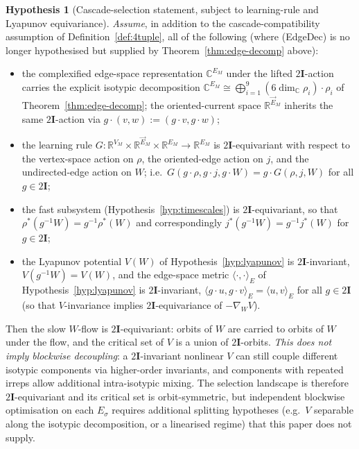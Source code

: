 \documentclass[11pt]{article}
\theoremstyle{definition}
\newtheorem{hypothesis}[theorem]{Hypothesis}
\newcommand{\R}{\mathbb{R}}
\newcommand{\C}{\mathbb{C}}
\newcommand{\twoI}{2\mathbf{I}}
\begin{document}
\begin{hypothesis}[Cascade-selection statement, subject to learning-rule and Lyapunov equivariance]\label{hyp:cascade-selection}
\emph{Assume}, in addition to the cascade-compatibility assumption of Definition~\ref{def:4tuple}, all of the following (where (EdgeDec) is no longer hypothesised but supplied by Theorem~\ref{thm:edge-decomp} above):
\begin{itemize}
    \item[\textup{(EdgeDec)} \emph{(supplied by Theorem~\ref{thm:edge-decomp})}] the complexified edge-space representation $\C^{E_M}$ under the lifted $\twoI$-action carries the explicit isotypic decomposition $\C^{E_M} \cong \bigoplus_{i=1}^9 (6\dim_\C\rho_i)\cdot\rho_i$ of Theorem~\ref{thm:edge-decomp}; the oriented-current space $\R^{\vec E_M}$ inherits the same $\twoI$-action via $g\cdot(v,w) := (g\cdot v, g\cdot w)$;
    \item[\textup{(LearnEq)}] the learning rule $G: \R^{V_M} \times \R^{\vec E_M} \times \R^{E_M} \to \R^{E_M}$ is $\twoI$-equivariant with respect to the vertex-space action on $\rho$, the oriented-edge action on $j$, and the undirected-edge action on $W$; i.e.\ $G(g \cdot \rho, g \cdot j, g \cdot W) = g \cdot G(\rho, j, W)$ for all $g \in \twoI$;
    \item[\textup{(FastEq)}] the fast subsystem (Hypothesis~\ref{hyp:timescales}) is $\twoI$-equivariant, so that $\rho^*(g^{-1} W) = g^{-1} \rho^*(W)$ and correspondingly $j^*(g^{-1} W) = g^{-1} j^*(W)$ for $g \in \twoI$;
    \item[\textup{(LyapInv)}] the Lyapunov potential $V(W)$ of Hypothesis~\ref{hyp:lyapunov} is $\twoI$-invariant, $V(g^{-1} W) = V(W)$, and the edge-space metric $\langle\cdot,\cdot\rangle_E$ of Hypothesis~\ref{hyp:lyapunov} is $\twoI$-invariant, $\langle g \cdot u, g \cdot v\rangle_E = \langle u, v \rangle_E$ for all $g \in \twoI$ (so that $V$-invariance implies $\twoI$-equivariance of $-\nabla_W V$).
\end{itemize}
Then the slow $W$-flow is $\twoI$-equivariant: orbits of $W$ are carried to orbits of $W$ under the flow, and the critical set of $V$ is a union of $\twoI$-orbits. \emph{This does not imply blockwise decoupling}: a $\twoI$-invariant nonlinear $V$ can still couple different isotypic components via higher-order invariants, and components with repeated irreps allow additional intra-isotypic mixing. The selection landscape is therefore $\twoI$-equivariant and its critical set is orbit-symmetric, but independent blockwise optimisation on each $E_\sigma$ requires additional splitting hypotheses (e.g.\ $V$ separable along the isotypic decomposition, or a linearised regime) that this paper does not supply.
\end{hypothesis}
\end{document}
